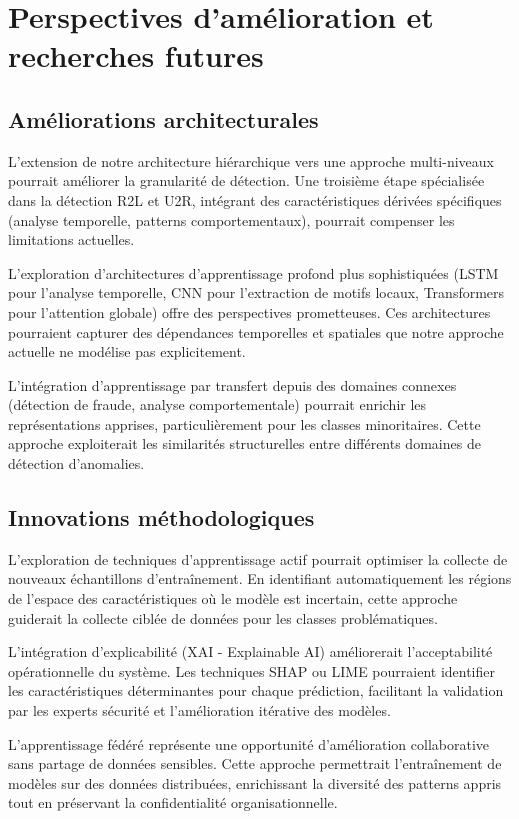 \section{Perspectives d'amélioration et recherches futures}

\subsection{Améliorations architecturales}

L'extension de notre architecture hiérarchique vers une approche multi-niveaux pourrait améliorer la granularité de détection. Une troisième étape spécialisée dans la détection R2L et U2R, intégrant des caractéristiques dérivées spécifiques (analyse temporelle, patterns comportementaux), pourrait compenser les limitations actuelles.

L'exploration d'architectures d'apprentissage profond plus sophistiquées (LSTM pour l'analyse temporelle, CNN pour l'extraction de motifs locaux, Transformers pour l'attention globale) offre des perspectives prometteuses. Ces architectures pourraient capturer des dépendances temporelles et spatiales que notre approche actuelle ne modélise pas explicitement.

L'intégration d'apprentissage par transfert depuis des domaines connexes (détection de fraude, analyse comportementale) pourrait enrichir les représentations apprises, particulièrement pour les classes minoritaires. Cette approche exploiterait les similarités structurelles entre différents domaines de détection d'anomalies.

\subsection{Innovations méthodologiques}

L'exploration de techniques d'apprentissage actif pourrait optimiser la collecte de nouveaux échantillons d'entraînement. En identifiant automatiquement les régions de l'espace des caractéristiques où le modèle est incertain, cette approche guiderait la collecte ciblée de données pour les classes problématiques.

L'intégration d'explicabilité (XAI - Explainable AI) améliorerait l'acceptabilité opérationnelle du système. Les techniques SHAP ou LIME pourraient identifier les caractéristiques déterminantes pour chaque prédiction, facilitant la validation par les experts sécurité et l'amélioration itérative des modèles.

L'apprentissage fédéré représente une opportunité d'amélioration collaborative sans partage de données sensibles. Cette approche permettrait l'entraînement de modèles sur des données distribuées, enrichissant la diversité des patterns appris tout en préservant la confidentialité organisationnelle.


